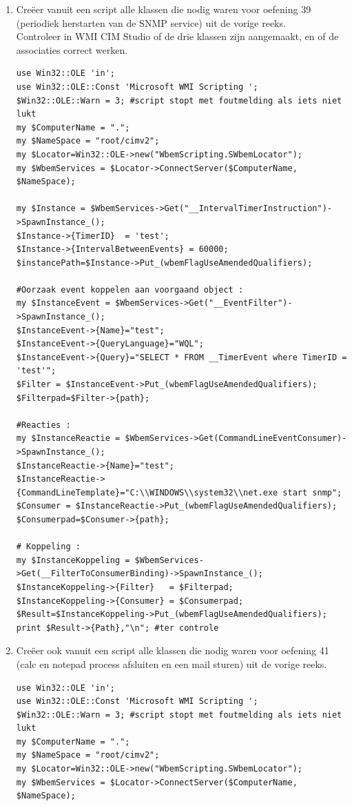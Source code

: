 \documentclass[11pt,a4paper]{report}
\begin{document}
\begin{enumerate}[resume]
	\item Creëer vanuit een script alle klassen die nodig waren voor oefening 39 (periodiek herstarten van de SNMP service) uit de vorige reeks.
	\\Controleer in WMI CIM Studio of de drie klassen zijn aangemaakt, en of de associaties correct werken.
	\begin{lstlisting}
use Win32::OLE 'in';
use Win32::OLE::Const 'Microsoft WMI Scripting ';
$Win32::OLE::Warn = 3; #script stopt met foutmelding als iets niet lukt
my $ComputerName = ".";
my $NameSpace = "root/cimv2";
my $Locator=Win32::OLE->new("WbemScripting.SWbemLocator");
my $WbemServices = $Locator->ConnectServer($ComputerName, $NameSpace);

my $Instance = $WbemServices->Get("__IntervalTimerInstruction")->SpawnInstance_();
$Instance->{TimerID}  = 'test';
$Instance->{IntervalBetweenEvents} = 60000;
$instancePath=$Instance->Put_(wbemFlagUseAmendedQualifiers);

#Oorzaak event koppelen aan voorgaand object : 
my $InstanceEvent = $WbemServices->Get("__EventFilter")->SpawnInstance_();
$InstanceEvent->{Name}="test";
$InstanceEvent->{QueryLanguage}="WQL";
$InstanceEvent->{Query}="SELECT * FROM __TimerEvent where TimerID = 'test'";
$Filter = $InstanceEvent->Put_(wbemFlagUseAmendedQualifiers);
$Filterpad=$Filter->{path};

#Reacties :
my $InstanceReactie = $WbemServices->Get(CommandLineEventConsumer)->SpawnInstance_();
$InstanceReactie->{Name}="test";
$InstanceReactie->{CommandLineTemplate}="C:\\WINDOWS\\system32\\net.exe start snmp";
$Consumer = $InstanceReactie->Put_(wbemFlagUseAmendedQualifiers);
$Consumerpad=$Consumer->{path}; 

# Koppeling : 
my $InstanceKoppeling = $WbemServices->Get(__FilterToConsumerBinding)->SpawnInstance_();
$InstanceKoppeling->{Filter}   = $Filterpad;
$InstanceKoppeling->{Consumer} = $Consumerpad;
$Result=$InstanceKoppeling->Put_(wbemFlagUseAmendedQualifiers);
print $Result->{Path},"\n"; #ter controle
	\end{lstlisting}
	\item Creëer ook vanuit een script alle klassen die nodig waren voor oefening 41 (calc en notepad process afsluiten en een mail sturen) uit de vorige reeks.
	\begin{lstlisting}
use Win32::OLE 'in';
use Win32::OLE::Const 'Microsoft WMI Scripting ';
$Win32::OLE::Warn = 3; #script stopt met foutmelding als iets niet lukt
my $ComputerName = ".";
my $NameSpace = "root/cimv2";
my $Locator=Win32::OLE->new("WbemScripting.SWbemLocator");
my $WbemServices = $Locator->ConnectServer($ComputerName, $NameSpace);


\end{lstlisting}
\end{enumerate}
\end{document}
